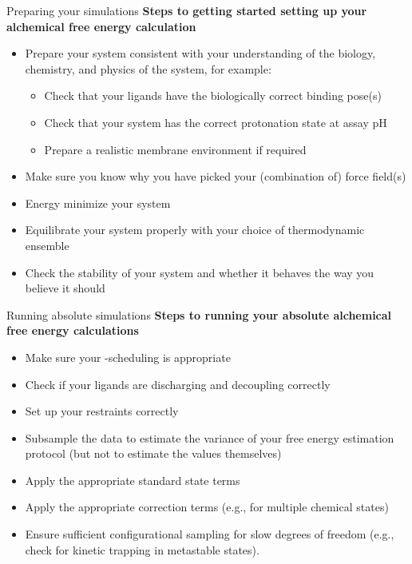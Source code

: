 \documentclass[9pt,bestpractices]{livecoms}
\begin{document}
\begin{Checklists*}
\begin{checklist}{Preparing your simulations}
\textbf{Steps to getting started setting up your alchemical free energy calculation}
\begin{itemize}
    \item Prepare your system consistent with your understanding of the biology, chemistry, and physics of the system, for example:
    \begin{itemize}
        \item Check that your ligands have the biologically correct binding pose(s)
        \item Check that your system has the correct protonation state at assay pH
        \item Prepare a realistic membrane environment if required
    \end{itemize}
    \item Make sure you know why you have picked your (combination of) force field(s)
    \item Energy minimize your system
    \item Equilibrate your system properly with your choice of thermodynamic ensemble
    \item Check the stability of your system and whether it behaves the way you believe it should
\end{itemize}
\end{checklist}

\begin{checklist}{Running absolute simulations}
        \textbf{Steps to running your absolute alchemical free energy calculations}
\begin{itemize}
    \item Make sure your \textlambda-scheduling is appropriate
    \item Check if your ligands are discharging and decoupling correctly
    \item Set up your restraints correctly
    \item Subsample the data to estimate the variance of your free energy estimation protocol (but not to estimate the values themselves)
    \item Apply the appropriate standard state terms
    \item Apply the appropriate correction terms (e.g., for multiple chemical states)
    \item Ensure sufficient configurational sampling for slow degrees of freedom (e.g., check for kinetic trapping in metastable states).
\end{itemize}
\end{checklist}


\end{Checklists*}
\end{document}
